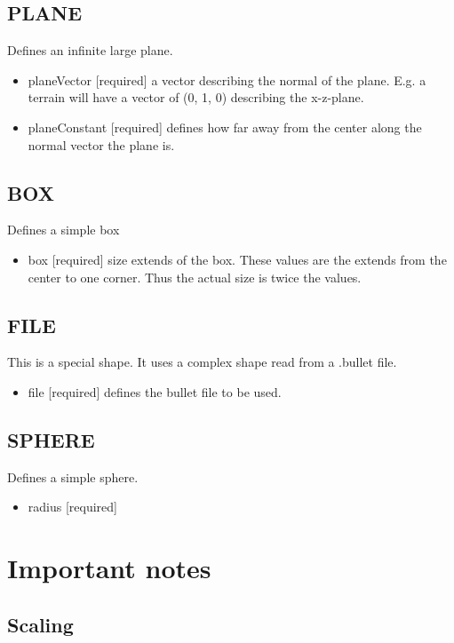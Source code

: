 \documentclass{article}
\begin{document}
\subsection{PLANE}

Defines an infinite large plane.
\begin{itemize}
	\item planeVector [required] a vector describing the normal of the plane. E.g. a terrain will have a vector of (0, 1, 0) describing the x-z-plane.
	\item planeConstant [required] defines how far away from the center along the normal vector the plane is.
\end{itemize}

\subsection{BOX}

Defines a simple box
\begin{itemize}
	\item box [required] size extends of the box. These values are the extends from the center to one corner. Thus the actual size is twice the values.
\end{itemize}

\subsection{FILE}

This is a special shape. It uses a complex shape read from a .bullet file.
\begin{itemize}
	\item file [required] defines the bullet file to be used.
\end{itemize}

\subsection{SPHERE}

Defines a simple sphere.
\begin{itemize}
	\item radius [required]
\end{itemize}

\section{Important notes}

\subsection{Scaling}\label{note:scaling}
\end{document}
